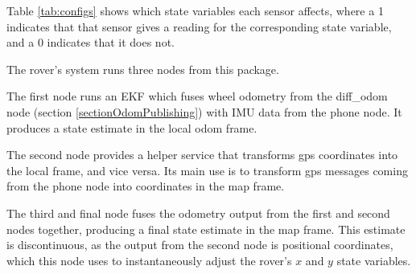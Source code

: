 Table \ref{tab:configs} shows which state variables each sensor affects, where a 1 indicates that that sensor gives a reading for the corresponding state variable, and a 0 indicates that it does not.

The rover's system runs three nodes from this package.

The first node runs an EKF which fuses wheel odometry from the diff\_odom node (section \ref{sectionOdomPublishing}) with IMU data from the phone node. It produces a state estimate in the local odom frame.

The second node provides a helper service that transforms gps coordinates into the local frame, and vice versa. Its main use is to transform gps messages coming from the phone node into coordinates in the map frame.

The third and final node fuses the odometry output from the first and second nodes together, producing a final  state estimate in the map frame. This estimate is discontinuous, as the output from the second node is positional coordinates, which this node uses to instantaneously adjust the rover's \(x\) and \(y\) state variables.